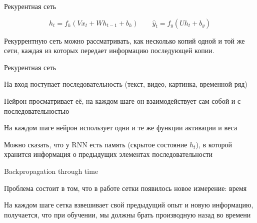 \documentclass[notes,12pt, aspectratio=169]{beamer}
\newenvironment{wideitemize}{\itemize\addtolength{\itemsep}{10pt}}{\enditemize}
\begin{document}
\begin{frame}{Рекурентная сеть}
\begin{center}
\end{center}

\[
h_t = f_h( V x_t + W h_{t-1} + b_h) \qquad \hat y_t = f_y ( U h_t + b_y)
\]

\vfill
\small \centering
\alert{Рекуррентную сеть можно рассматривать, как несколько копий одной и той же сети, каждая из которых передает информацию последующей копии. }
\end{frame}


\begin{frame}{Рекурентная сеть}
\begin{wideitemize} 
	\item  На вход поступает последовательность (текст, видео, картинка, временной ряд)
	\item  Нейрон просматривает её, на каждом шаге он взаимодействует сам собой и с последовательностью 
	\item \alert{На каждом шаге нейрон использует одни и те же функции активации и веса}
	\item Можно сказать, что у RNN есть память (скрытое состояние $h_t$), в которой хранится информация о предыдущих элементах последовательности
\end{wideitemize} 
\end{frame}






\begin{frame}{Backpropagation through time}
\begin{wideitemize} 
	\item  \alert{Проблема} состоит в том, что в работе сетки появилось \alert{новое измерение: время} 
	
	\item На каждом шаге сетка взвешивает свой предыдущий опыт и новую информацию, получается, что при обучении, мы должны брать производную назад во времени
\end{wideitemize} 
\end{frame}
\end{document}
